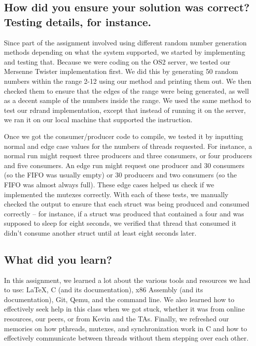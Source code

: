 \documentclass[letterpaper,10pt]{article}
\begin{document}
\subsection{How did you ensure your solution was correct? Testing details, for instance.}
Since part of the assignment involved using different random number generation methods depending on what the system supported, we started by implementing and testing that.
Because we were coding on the OS2 server, we tested our Mersenne Twister implementation first.
We did this by generating 50 random numbers within the range 2-12 using our method and printing them out.
We then checked them to ensure that the edges of the range were being generated, as well as a decent sample of the numbers inside the range.
We used the same method to test our rdrand implementation, except that instead of running it on the server, we ran it on our local machine that supported the instruction.

Once we got the consumer/producer code to compile, we tested it by inputting normal and edge case values for the numbers of threads requested.
For instance, a normal run might request three producers and three consumers, or four producers and five consumers.
An edge run might request one producer and 30 consumers (so the FIFO was usually empty) or 30 producers and two consumers (so the FIFO was almost always full).
These edge cases helped us check if we implemented the mutexes correctly.
With each of these tests, we manually checked the output to ensure that each struct was being produced and consumed correctly – for instance, if a struct was produced that contained a four and was supposed to sleep for eight seconds, we verified that thread that consumed it didn’t consume another struct until at least eight seconds later.


\subsection{What did you learn?}
In this assignment, we learned a lot about the various tools and resources we had to use: LaTeX, C (and its documentation), x86 Assembly (and its documentation), Git, Qemu, and the command line.
We also learned how to effectively seek help in this class when we got stuck, whether it was from online resources, our peers, or from Kevin and the TAs.
Finally, we refreshed our memories on how pthreads, mutexes, and synchronization work in C and how to effectively communicate between threads without them stepping over each other.
\end{document}
